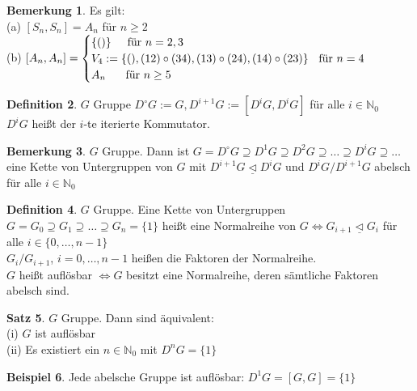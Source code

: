 \documentclass[10pt,a4paper,numbers=endperiod]{scrreprt}
\theoremstyle{definition}
\newtheorem{satz}{Satz}[section]
\newtheorem{defi}[satz]{Definition}
\newtheorem{bem}[satz]{Bemerkung}
\newtheorem{bsp}[satz]{Beispiel}
\def\NN{{\mathbb N}}
\begin{document}
\begin{bem}
	Es gilt:\\
	(a) $[S_n, S_n] = A_n$ für $n \geq 2$\\
	(b) $[A_n, A_n] = \begin{cases}
	\{()\} \hspace{5 mm} \text{für } n = 2,3\\
	V_4 := \{(), (12) \circ (34), (13) \circ (24), (14) \circ (23)\} \hspace{2mm} \text{ für } n = 4\\
	A_n \hspace{5mm} \text{ für } n \geq 5\\
	\end{cases}$
\end{bem}

\begin{defi}
	$G$ Gruppe $D^{\circ} G := G, D^{i+1} G := [D^i G, D^i G]$ für alle $i \in \NN_0$\\
	$D^iG$ heißt der $i$-te iterierte Kommutator.
\end{defi}

\begin{bem}
	$G$ Gruppe. Dann ist $G = D^{\circ} G \supseteq D^1G \supseteq D^2G \supseteq \ldots \supseteq D^iG \supseteq \ldots$ eine Kette von Untergruppen von $G$ mit $D^{i+1}G \underline{\vartriangleleft} D^i G$ und $D^i G/ D^{i+1}G$ abelsch für alle $i \in \NN_0$
\end{bem}

\begin{defi}
	$G$ Gruppe. Eine Kette von Untergruppen $G = G_0 \supseteq G_1 \supseteq \ldots \supseteq G_n = \{1\}$ heißt eine Normalreihe von $G \Leftrightarrow G_{i+1} \underline{\vartriangleleft} G_i$ für alle $i \in \{0, \ldots, n-1\}$\\
	$G_i/G_{i+1}$, $i = 0, \ldots, n-1$ heißen die Faktoren der Normalreihe.\\
	$G$ heißt auflösbar $\Leftrightarrow G$ besitzt eine Normalreihe, deren sämtliche Faktoren abelsch sind. 
\end{defi}

\begin{satz}
	$G$ Gruppe. Dann sind äquivalent:\\
	(i) $G$ ist auflösbar\\
	(ii) Es existiert ein $n \in \NN_0$ mit $D^nG = \{1\}$
\end{satz}

\begin{bsp}
	Jede abelsche Gruppe ist auflösbar: $D^1G = [G, G] = \{1\}$
\end{bsp}
\end{document}
